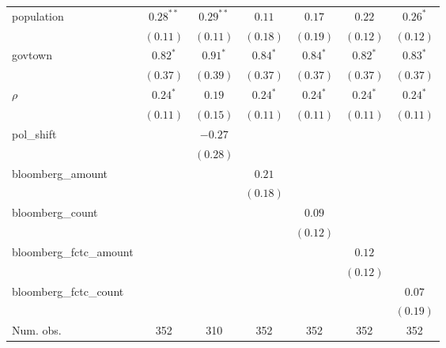 \begin{table}[!h]
\begin{center}
\begin{tabular}{l c c c c c c }
population              & $0.28^{**}$  & $0.29^{**}$  & $0.11$       & $0.17$       & $0.22$       & $0.26^{*}$   \\
                        & $(0.11)$     & $(0.11)$     & $(0.18)$     & $(0.19)$     & $(0.12)$     & $(0.12)$     \\
govtown                 & $0.82^{*}$   & $0.91^{*}$   & $0.84^{*}$   & $0.84^{*}$   & $0.82^{*}$   & $0.83^{*}$   \\
                        & $(0.37)$     & $(0.39)$     & $(0.37)$     & $(0.37)$     & $(0.37)$     & $(0.37)$     \\
$\rho$                  & $0.24^{*}$   & $0.19$       & $0.24^{*}$   & $0.24^{*}$   & $0.24^{*}$   & $0.24^{*}$   \\
                        & $(0.11)$     & $(0.15)$     & $(0.11)$     & $(0.11)$     & $(0.11)$     & $(0.11)$     \\
pol\_shift              &              & $-0.27$      &              &              &              &              \\
                        &              & $(0.28)$     &              &              &              &              \\
bloomberg\_amount       &              &              & $0.21$       &              &              &              \\
                        &              &              & $(0.18)$     &              &              &              \\
bloomberg\_count        &              &              &              & $0.09$       &              &              \\
                        &              &              &              & $(0.12)$     &              &              \\
bloomberg\_fctc\_amount &              &              &              &              & $0.12$       &              \\
                        &              &              &              &              & $(0.12)$     &              \\
bloomberg\_fctc\_count  &              &              &              &              &              & $0.07$       \\
                        &              &              &              &              &              & $(0.19)$     \\
\midrule
Num. obs.               & 352          & 310          & 352          & 352          & 352          & 352          \\

\end{tabular}
\end{center}
\end{table}
